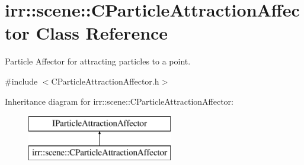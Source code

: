 \hypertarget{classirr_1_1scene_1_1_c_particle_attraction_affector}{\section{irr\-:\-:scene\-:\-:C\-Particle\-Attraction\-Affector Class Reference}
\label{classirr_1_1scene_1_1_c_particle_attraction_affector}
}


Particle Affector for attracting particles to a point.  




{\ttfamily \#include $<$C\-Particle\-Attraction\-Affector.\-h$>$}

Inheritance diagram for irr\-:\-:scene\-:\-:C\-Particle\-Attraction\-Affector\-:\begin{figure}[H]
\begin{center}
\leavevmode
\includegraphics[height=2.000000cm]{classirr_1_1scene_1_1_c_particle_attraction_affector}
\end{center}
\end{figure}
